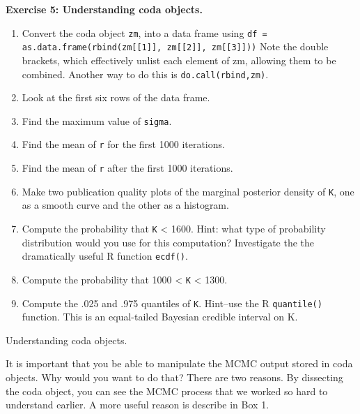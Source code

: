 \documentclass[12pt,english]{article}
\begin{document}
\belowcaptionskip=-30pt
\begin{exercise}

\begin{mdframed}
\doublespacing
\textbf{Exercise 5: Understanding coda objects.}
\begin{enumerate}
\item Convert the coda object \texttt{zm}, into a data frame using \texttt{df = as.data.frame(rbind(zm[[1]], zm[[2]], zm[[3]]))}  Note the double brackets, which effectively unlist each element of zm, allowing them to be combined. Another way to do this is \texttt{do.call(rbind,zm)}.
\item Look at the first six rows of the data frame.
\item Find the maximum value of \texttt{sigma}.
\item Find the mean of \texttt{r} for the first 1000 iterations.
\item Find the mean of \texttt{r} after the first 1000 iterations.
\item Make two publication quality plots of the marginal posterior density of \texttt{K}, one as a smooth curve and the other as a histogram.
\item Compute the probability that \texttt{K} < 1600. Hint: what type of probability distribution would you use for this computation?  Investigate the the dramatically useful R function \texttt{ecdf()}.
\item Compute the probability that 1000 < \texttt{K} < 1300.
\item Compute the .025 and .975 quantiles of \texttt{K}.  Hint--use the R \texttt{quantile()} function. This is an equal-tailed Bayesian credible interval on K.
\end{enumerate}
\end{mdframed}
\captionsetup{textformat=empty, labelformat=empty}
\caption[Understanding coda objects]{Understanding coda objects.}
\label{ex:coda understanding}
\end{exercise}
\belowcaptionskip=0pt

It is important that you be able to manipulate the MCMC output stored in coda objects. Why would you want to do that? There are two reasons. By dissecting the coda object, you can see the MCMC process that we worked so hard to understand earlier. A more useful reason is describe in Box 1.
\end{document}
